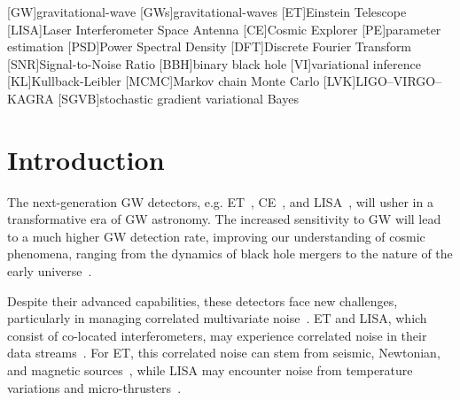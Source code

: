 \documentclass[%
 reprint,
 amsmath,amssymb,
 aps,
 nofootinbib,
]{revtex4-2}
\begin{document}
\maketitle


\begin{acronym}
    [GW]{gravitational-wave}
    [GWs]{gravitational-waves}
    [ET]{Einstein Telescope}
    [LISA]{Laser Interferometer Space Antenna}
    [CE]{Cosmic Explorer}
    [PE]{parameter estimation}
    [PSD]{Power Spectral Density}
    [DFT]{Discrete Fourier Transform}
    [SNR]{Signal-to-Noise Ratio}
    [BBH]{binary black hole}
    [VI]{variational inference}
    [KL]{Kullback-Leibler}
    [MCMC]{Markov chain Monte Carlo}
    [LVK]{LIGO--VIRGO--KAGRA}
    [SGVB]{stochastic gradient variational Bayes}
\end{acronym}


\section{Introduction}

The next-generation \ac{GW} detectors, e.g. \ac{ET}~\cite{Punturo_2010}, \ac{CE}~\cite{CE_horizon_study}, and \ac{LISA}~\cite{LISA_science_case}, will usher in a transformative era of \ac{GW} astronomy. 
The increased sensitivity to \ac{GW} will lead to a much higher \ac{GW} detection rate, improving our understanding of cosmic phenomena, ranging from the dynamics of black hole mergers to the nature of the early universe~\cite{ET_science_case, Maggiore_2020_ET_science_case, Branchesi_2023_ET_science_case, CE_horizon_study, LISA_science_case}.

Despite their advanced capabilities, these detectors face new challenges, particularly in managing correlated multivariate noise~\cite{ET_design_report,LISA_red_book}.
\ac{ET} and \ac{LISA}, which consist of co-located interferometers, may experience correlated noise in their data streams~\cite{Janssens2023}. 
For \ac{ET}, this correlated noise can stem from seismic, Newtonian, and magnetic sources~\cite{Ball_lightning_strokes, Janssens_newtonian_seismic, Janssens_magnetic_noise}, while \ac{LISA}  may encounter noise from temperature variations and micro-thrusters~\cite{lisa_temp_noise,lisa_thrusters_noise}. 
\end{document}
